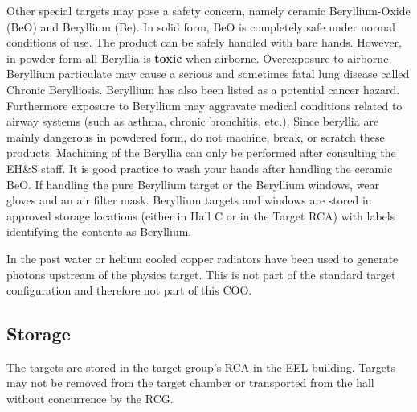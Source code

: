 {Other special targets may pose a safety concern, namely ceramic {
  Beryllium-Oxide (BeO)} and { Beryllium (Be)}.  In solid form, BeO is
completely safe under normal conditions of use.  The product can be
safely handled with bare hands.  However, in powder form all Beryllia
is {\bf toxic} when airborne.  { Overexposure to airborne Beryllium
  particulate may cause a serious and sometimes fatal lung disease
  called Chronic Berylliosis. Beryllium has also been listed as a
  potential cancer hazard. Furthermore exposure to Beryllium may
  aggravate medical conditions related to airway systems (such as
  asthma, chronic bronchitis, etc.).}  Since beryllia are mainly
dangerous in powdered form, do not machine, break, or scratch these
products. Machining of the Beryllia can only be performed after
consulting the EH\&S staff.  It is good practice to wash your hands
after handling the ceramic BeO. If handling the pure Beryllium target
or the Beryllium windows, wear gloves and an air filter mask.
Beryllium targets and windows are stored in approved storage locations
(either in Hall C or in the Target RCA) with labels identifying the
contents as Beryllium.

In the past water or helium cooled copper radiators have been used to
generate photons upstream of the physics target. This is not part of
the standard target configuration and therefore not part of this COO.

\subsection{Storage}

The targets are stored in the target group's RCA in the EEL building.
Targets may not be removed from the target chamber or transported from
the hall without concurrence by the RCG.

}
